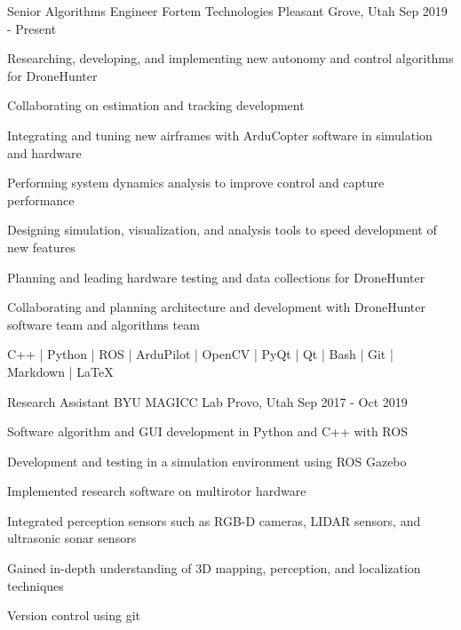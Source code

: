 
\begin{cventries}

\cventry
  {Senior Algorithms Engineer}
  {Fortem Technologies}
  {Pleasant Grove, Utah}
  {Sep 2019 - Present}
  {
    \begin{cvitems}
      \item{Researching, developing, and implementing new autonomy and control algorithms for DroneHunter}
      \item{Collaborating on estimation and tracking development}
      \item{Integrating and tuning new airframes with ArduCopter software in simulation and hardware}
      \item{Performing system dynamics analysis to improve control and capture performance}
      \item{Designing simulation, visualization, and analysis tools to speed development of new features}
      \item{Planning and leading hardware testing and data collections for DroneHunter}
      \item{Collaborating and planning architecture and development with DroneHunter software team and algorithms team}
      \item{C++ | Python | ROS | ArduPilot | OpenCV | PyQt | Qt | Bash | Git | Markdown | LaTeX }
    \end{cvitems}
  }

\cventry
  {Research Assistant} %
  {BYU MAGICC Lab} %
  {Provo, Utah} %
  {Sep 2017 - Oct 2019} %
  {
    \begin{cvitems} %
      \item{Software algorithm and GUI development in Python and C++ with ROS}
      \item{Development and testing in a simulation environment using ROS Gazebo}
      \item{Implemented research software on multirotor hardware}
      \item{Integrated perception sensors such as RGB-D cameras, LIDAR sensors, and ultrasonic sonar sensors}
      \item{Gained in-depth understanding of 3D mapping, perception, and localization techniques}
      \item{Version control using git}
    \end{cvitems}
  }


\end{cventries}
